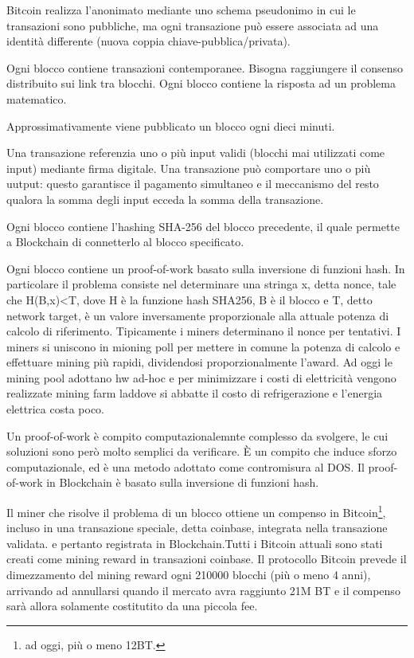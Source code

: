 Bitcoin realizza l'anonimato mediante uno schema pseudonimo in cui le transazioni sono pubbliche, ma ogni transazione può essere associata ad una identità differente (nuova coppia chiave-pubblica/privata).

Ogni blocco contiene transazioni contemporanee. Bisogna raggiungere il consenso distribuito sui link tra blocchi.
Ogni blocco contiene la risposta ad un problema matematico.

Approssimativamente viene pubblicato un blocco ogni dieci minuti.

Una transazione referenzia uno o più input validi (blocchi mai utilizzati come input) mediante firma digitale. Una transazione può comportare uno o più uutput: questo garantisce il pagamento simultaneo e il meccanismo del resto qualora la somma degli input ecceda la somma della transazione.

Ogni blocco contiene l'hashing SHA-256 del blocco precedente, il quale permette a Blockchain di connetterlo al blocco specificato.

Ogni blocco contiene un proof-of-work basato sulla inversione di funzioni hash.
In particolare il problema consiste nel determinare una stringa x, detta nonce, tale che H(B,x)<T, dove H è la funzione hash SHA256, B è il blocco e T, detto network target, è un valore inversamente proporzionale alla attuale potenza di calcolo di riferimento. Tipicamente i miners determinano il nonce per tentativi.
I miners si uniscono in mioning poll per mettere in comune la potenza di calcolo e effettuare mining più rapidi, dividendosi proporzionalmente l'award.
Ad oggi le mining pool adottano hw ad-hoc e per minimizzare i costi di elettricità vengono realizzate mining farm laddove si abbatte il costo di refrigerazione e l'energia elettrica costa poco.

Un proof-of-work è compito computazionalemnte complesso da svolgere, le cui soluzioni sono però molto semplici da verificare. È un compito che induce sforzo computazionale, ed è una metodo adottato come contromisura al DOS.
Il proof-of-work in Blockchain è basato sulla inversione di funzioni hash.

Il miner che risolve il problema di un blocco ottiene un compenso in Bitcoin\footnote{ad oggi, più o meno 12BT.}, incluso in una transazione speciale, detta coinbase, integrata nella transazione validata. e pertanto registrata in Blockchain.Tutti i Bitcoin attuali sono stati creati come mining reward in transazioni coinbase. Il protocollo Bitcoin prevede il dimezzamento del mining reward ogni 210000 blocchi (più o meno 4 anni), arrivando ad annullarsi quando il mercato avra raggiunto 21M BT e il compenso sarà allora solamente costitutito da una piccola fee.
